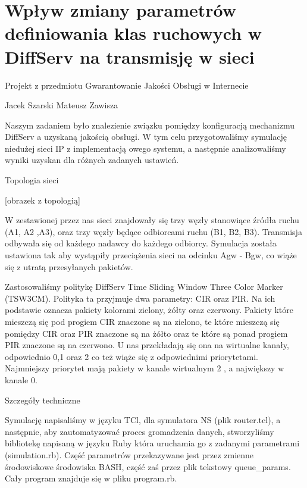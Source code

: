 \documentclass[a4paper]{article}
\begin{document}
\section{Wpływ zmiany parametrów definiowania klas ruchowych w DiffServ na transmisję w sieci}






Projekt z przedmiotu Gwarantowanie Jakości Obsługi w Internecie







Jacek Szarski
Mateusz Zawisza


Naszym zadaniem było znalezienie związku pomiędzy konfiguracją mechanizmu DiffServ a uzyskaną jakością obsługi. W tym celu przygotowaliśmy symulację niedużej sieci IP z implementacją owego systemu, a następnie analizowaliśmy wyniki uzyskan dla różnych zadanych ustawień.


Topologia sieci

[obrazek z topologią]


W zestawionej przez nas sieci znajdowały się trzy węzły stanowiące źródła ruchu (A1, A2 ,A3), oraz trzy węzły będące odbiorcami ruchu (B1, B2, B3). Transmisja odbywała się od każdego nadawcy do każdego odbiorcy. Symulacja została ustawiona tak aby wystąpiły przeciążenia sieci na odcinku Agw - Bgw, co wiąże się z utratą przesyłanych pakietów.

Zastosowaliśmy politykę DiffServ Time Sliding Window Three Color Marker (TSW3CM).
Polityka ta przyjmuje dwa parametry: CIR oraz PIR. Na ich podstawie oznacza pakiety kolorami zielony, żółty oraz czerwony. Pakiety które mieszczą się pod progiem CIR znaczone są na zielono, te które mieszczą się pomiędzy CIR oraz PIR znaczone są na żółto oraz te które są ponad progiem PIR znaczone są na czerwono. U nas przekładają się ona na wirtualne kanały, odpowiednio 0,1 oraz 2 co też wiąże się z odpowiednimi priorytetami. Najmniejszy priorytet mają pakiety w kanale wirtualnym 2 , a największy w kanale 0.


Szczegóły techniczne

Symulację napisaliśmy w języku TCl, dla symulatora NS (plik router.tcl), a następnie, aby zautomatyzować proces gromadzenia danych, stworzyliśmy bibliotekę napisaną w języku Ruby która uruchamia go z zadanymi parametrami (simulation.rb). Część parametrów przekazywane jest przez zmienne środowiskowe środowiska BASH, część zaś przez plik tekstowy queue_params. Cały program znajduje się w pliku program.rb.
\end{document}
